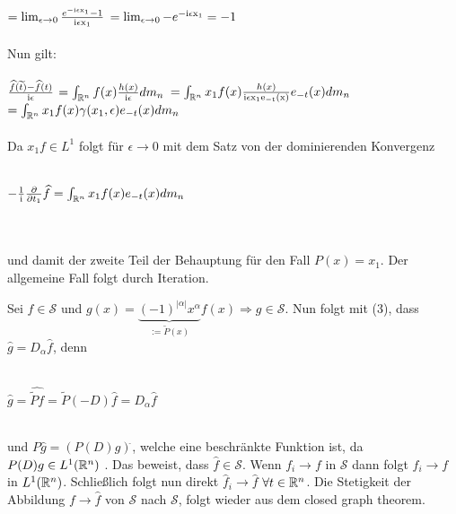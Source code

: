 \documentclass{article}
\def\ie{\rm i}
\begin{document}
\begin{beweis}
\begin{liste}
		      $ = \lim_{\epsilon \to 0} \frac{e^{-\ie\epsilon x_1}-1}{\ie\epsilon x_1}$ 
			  $ = \lim_{\epsilon \to 0} -e^{-\ie\epsilon x_1} = -1$ \\ \\
		      Nun gilt: \\ \\ $\frac{\widehat{f}(\widetilde{t})-\widehat{f}(t)}{\ie\epsilon}$ 
		      $ = \int_{\MdR^n} f(x)\frac{h(x)}{\ie\epsilon} d m_n $
		      $ = \int_{\MdR^n} x_1 f(x)\frac{h(x)}{\ie\epsilon x_1 e_{-t}(x)} e_{-t}(x) d m_n $
		      $ = \int_{\mathbb{R}^n} x_1 f(x) \gamma(x_1, \epsilon) e_{-t}(x) d m_n $ \\ \\
		      Da $ x_1 f \in L^1$ folgt für $\epsilon \to 0$ mit dem Satz von der dominierenden Konvergenz \\ \\
			  \centerline{$- \frac{1}{\ie}\frac{\partial}{\partial t_1} \widehat{f} = \int_{\MdR^n} x_1 f(x)e_{-t}(x) d m_n $} \\ \\
			  und damit der zweite Teil der Behauptung für den Fall $P(x) = x_1$. Der allgemeine Fall folgt durch Iteration. 	      
		\item Sei $f \in \mathcal{S}$ und $g(x) = \underbrace{(-1)^{|\alpha|}x^{\alpha}}_{:= \widetilde{P}(x)}f(x) \Rightarrow g \in \mathcal{S}$. 
		      Nun folgt mit (3), dass $\widehat{g} = D_{\alpha} \widehat{f}$, denn \\ \\
		      \centerline{$\widehat{g} = \widehat{\widetilde{P}f} = \widetilde{P}(-D) \widehat{f} = D_{\alpha} \widehat{f}$} \\
		       und $P \widehat{g} = (P(D)g)^{\widehat{}}$, welche
		      eine beschränkte Funktion ist, da $P(D)g \in L^1(\mathbb{R}^n)$ . Das beweist, dass $\widehat{f} \in \mathcal{S}$.
		      Wenn $f_i \to f$ in $\mathcal{S}$ dann folgt $f_i \to f$ in $L^1(\mathbb{R}^n)$. Schließlich folgt nun direkt 
		      $\widehat{f}_i \to \widehat{f}$ $\forall t \in \mathbb{R}^n$.  Die Stetigkeit der Abbildung $f \to \widehat{f}$ von 
			  $\mathcal{S}$ nach $\mathcal{S}$, folgt wieder aus dem closed graph theorem.
		    
	\end{liste}
\end{beweis}
\end{document}
